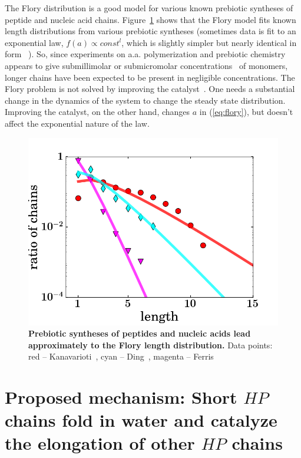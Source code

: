 \documentclass[journal=jacsat,manuscript=article,layout=twocolumn]{achemso}
\begin{document}
The Flory distribution is a good model for various known prebiotic syntheses of peptide and 
nucleic 
acid chains.  Figure~\ref{fig:some_flory} shows that the Flory model fits known length 
distributions from various prebiotic syntheses (sometimes data is fit to an exponential law, 
$f(a)\propto 
const^l$, which is slightly simpler but nearly identical in form 
~\cite{nowak2008prevolutionary,Derr2012}).  So, since experiments on a.a. polymerization and 
prebiotic chemistry appears to give submillimolar or submicromolar 
concentrations~\cite{Stribling1987,Huber1998,Aubrey2009,Kanavarioti2001,Lazcano1996} of monomers, 
longer chains have been expected to be present in negligible concentrations.  The Flory problem is 
not solved by improving the catalyst~\cite{Derr2012}. 
One needs 
a substantial change in the dynamics of the system to change the steady state distribution. 
Improving the catalyst, on the other hand, changes $a$ in (\ref{eq:flory}), but doesn't affect the 
exponential nature of the law.

\begin{figure}[h!]
  \centering
  \includegraphics[width=\columnwidth]{pictures/some_flory.png} 
  \caption{\textbf{Prebiotic syntheses of peptides and nucleic acids lead approximately to the 
Flory length distribution.}  Data 
points: red -- Kanavarioti~\cite{Kanavarioti2001}, cyan -- Ding~\cite{Ding1996}, 
magenta -- Ferris~\cite{Ferris1999}}
  \label{fig:some_flory}
\end{figure}


\section{Proposed mechanism: Short $HP$ chains fold in water and catalyze the elongation of other 
$HP$ chains}
\end{document}
